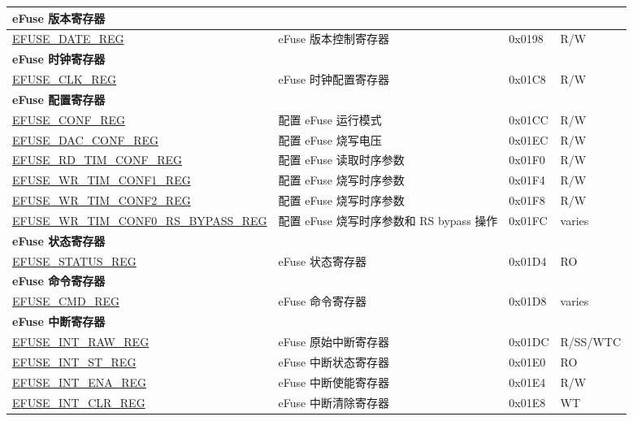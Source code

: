 \begin{longtable}{ | p{7cm} | p{7.2cm} | p{1.3cm} | p{1cm} | }
\multicolumn{4}{|l|}{\textbf{eFuse 版本寄存器}} \\ \hline
\hyperref[regdesc:EFUSEDATEREG]{EFUSE\_DATE\_REG} & eFuse 版本控制寄存器 & 0x0198 & R/W \\ \hline
\multicolumn{4}{|l|}{\textbf{eFuse 时钟寄存器}} \\ \hline
\hyperref[regdesc:EFUSECLKREG]{EFUSE\_CLK\_REG} & eFuse 时钟配置寄存器 & 0x01C8 & R/W \\ \hline
\multicolumn{4}{|l|}{\textbf{eFuse 配置寄存器}} \\ \hline
\hyperref[regdesc:EFUSECONFREG]{EFUSE\_CONF\_REG} & 配置 eFuse 运行模式 & 0x01CC & R/W \\ \hline
\hyperref[regdesc:EFUSEDACCONFREG]{EFUSE\_DAC\_CONF\_REG} & 配置 eFuse 烧写电压 & 0x01EC & R/W \\ \hline
\hyperref[regdesc:EFUSERDTIMCONFREG]{EFUSE\_RD\_TIM\_CONF\_REG} & 配置 eFuse 读取时序参数 & 0x01F0 & R/W \\ \hline
\hyperref[regdesc:EFUSEWRTIMCONF1REG]{EFUSE\_WR\_TIM\_CONF1\_REG} & 配置 eFuse 烧写时序参数 & 0x01F4 & R/W \\ \hline
\hyperref[regdesc:EFUSEWRTIMCONF2REG]{EFUSE\_WR\_TIM\_CONF2\_REG} &配置 eFuse 烧写时序参数 & 0x01F8 & R/W \\ \hline
\hyperref[regdesc:EFUSEWRTIMCONF0RSBYPASSREG]{EFUSE\_WR\_TIM\_CONF0\_RS\_BYPASS\_REG} & 配置 eFuse 烧写时序参数和 RS bypass 操作 & 0x01FC & varies \\ \hline
\multicolumn{4}{|l|}{\textbf{eFuse 状态寄存器}} \\ \hline
\hyperref[regdesc:EFUSESTATUSREG]{EFUSE\_STATUS\_REG} & eFuse 状态寄存器 & 0x01D4 & RO \\ \hline
\multicolumn{4}{|l|}{\textbf{eFuse 命令寄存器}} \\ \hline
\hyperref[regdesc:EFUSECMDREG]{EFUSE\_CMD\_REG} & eFuse 命令寄存器 & 0x01D8 & varies \\ \hline
\multicolumn{4}{|l|}{\textbf{eFuse 中断寄存器}} \\ \hline
\hyperref[regdesc:EFUSEINTRAWREG]{EFUSE\_INT\_RAW\_REG} & eFuse 原始中断寄存器 & 0x01DC & R/SS/WTC \\ \hline
\hyperref[regdesc:EFUSEINTSTREG]{EFUSE\_INT\_ST\_REG} & eFuse 中断状态寄存器 & 0x01E0 & RO \\ \hline
\hyperref[regdesc:EFUSEINTENAREG]{EFUSE\_INT\_ENA\_REG} & eFuse 中断使能寄存器 & 0x01E4 & R/W \\ \hline
\hyperref[regdesc:EFUSEINTCLRREG]{EFUSE\_INT\_CLR\_REG} & eFuse 中断清除寄存器 & 0x01E8 & WT \\ \hline
\end{longtable}
